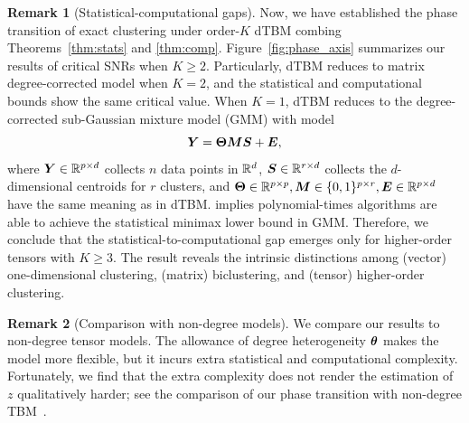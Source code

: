 \documentclass[lettersize,onecolumn,journal]{IEEEtran}
\theoremstyle{definition}
\theoremstyle{definition}
\newtheorem{rmk}{Remark}
\def\fixme#1#2{\textbf{\color{red}[FIXME (#1): #2]}}
\begin{document}
\begin{rmk}[Statistical-computational gaps]
Now, we have established the phase transition of exact clustering under order-$K$ dTBM combing Theorems~\ref{thm:stats} and \ref{thm:comp}. Figure~\ref{fig:phase_axis} summarizes our results of critical SNRs when $K \geq 2$. Particularly, dTBM reduces to matrix degree-corrected model when $K =2$, and the statistical and computational bounds show the same critical value. When $K =1$, dTBM reduces to the degree-corrected sub-Gaussian mixture model (GMM) with model
\begin{equation}
    \bm Y = \boldsymbol{\Theta} \bm M \bm S + \bm{E},
\end{equation}
where $\bm Y \in \mathbb{R}^{p \times d}$ collects $n$ data points in $\mathbb{R}^d$, $\bm S \in \mathbb{R}^{r \times d}$ collects the $d$-dimensional centroids for $r$ clusters, and $\boldsymbol{\Theta} \in \mathbb{R}^{p \times p}, \bm M \in \{0,1\}^{p \times r}, \bm{E} \in \mathbb{R}^{p \times d}$ have the same meaning as in dTBM. \cite{lu2016statistical} implies polynomial-times algorithms are able to achieve the statistical minimax lower bound in GMM. Therefore, we conclude that the statistical-to-computational gap emerges only for higher-order tensors with $K \geq 3$. The result reveals the intrinsic distinctions among (vector) one-dimensional clustering, (matrix) biclustering, and (tensor) higher-order clustering. 
\end{rmk}


\begin{rmk}[Comparison with non-degree models]
We compare our results to non-degree tensor models. 
The allowance of degree heterogeneity $\boldsymbol{\theta}$ makes the model more flexible, but it incurs extra statistical and computational complexity. Fortunately, we find that the extra complexity does not render the estimation of $z$ qualitatively harder; see the comparison of our phase transition with non-degree TBM~\citep{han2020exact}. 
\end{rmk}
\end{document}

